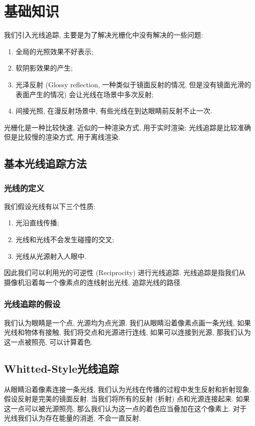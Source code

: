 \section{基础知识}

我们引入光线追踪, 主要是为了解决光栅化中没有解决的一些问题: 
\begin{enumerate}
	\item 全局的光照效果不好表示; 
	\item 软阴影效果的产生; 
	\item 光泽反射 (Glossy reflection, 一种类似于镜面反射的情况, 但是没有镜面光滑的表面产生的情况) 会让光线在场景中多次反射; 
	\item 间接光照, 在漫反射场景中, 有些光线在到达眼睛前反射不止一次. 
\end{enumerate}

光栅化是一种比较快速, 近似的一种渲染方式, 用于实时渲染; 光线追踪是比较准确但是比较慢的渲染方式, 用于离线渲染. 

\subsection{基本光线追踪方法}

\subsubsection{光线的定义}

我们假设光线有以下三个性质: 
\begin{enumerate}
	\item 光沿直线传播; 
	\item 光线和光线不会发生碰撞的交叉; 
	\item 光线从光源射入人眼中. 
\end{enumerate}
因此我们可以利用光的可逆性 (Reciprocity) 进行光线追踪. 光线追踪是指我们从摄像机沿着每一个像素点的连线射出光线, 追踪光线的路径. 

\subsubsection{光线追踪的假设}
我们认为眼睛是一个点, 光源均为点光源. 我们从眼睛沿着像素点画一条光线, 如果光线和物体有接触, 我们将交点和光源进行连线, 如果可以连接到光源, 那我们认为这一点被照亮, 可以计算着色. 

\subsection{Whitted-Style光线追踪}
从眼睛沿着像素连接一条光线, 我们认为光线在传播的过程中发生反射和折射现象. 假设反射是完美的镜面反射. 当我们将所有的反射 (折射) 点和光源连接起来. 如果这一点可以被光源照亮, 那么我们认为这一点的着色应当叠加在这个像素上. 对于光线我们认为存在能量的消逝, 不会一直反射. 

